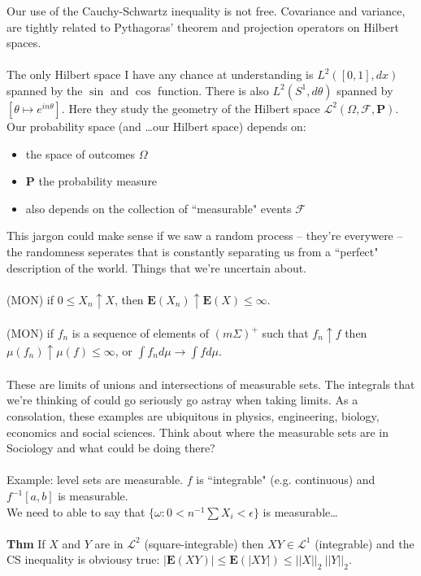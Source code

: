 \documentclass[12pt]{article}
\begin{document}
Our use of the Cauchy-Schwartz inequality is not free.  Covariance and variance, are tightly related to Pythagoras' theorem and projection operators on Hilbert spaces.   \\ \\
The only Hilbert space I have any chance at understanding is $L^2([0,1], dx)$ spanned by the $\sin$ and $\cos$ function. There is also $L^2(S^1, d\theta)$ spanned by $[\theta \mapsto e^{in\theta}]$.  Here they study the geometry of the Hilbert space $\mathcal{L}^2(\Omega, \mathcal{F}, \textbf{P})$.  Our probability space (and \dots our Hilbert space) depends on:
\begin{itemize}
\item the space of outcomes $\Omega$
\item $\textbf{P}$ the probability measure
\item also depends on the collection of ``measurable" events $\mathcal{F}$
\end{itemize}
This jargon could make sense if we saw a random process -- they're everywere -- the randomness seperates that is constantly separating us from a ``perfect" description of the world.  Things that we're uncertain about. \\ \\
(MON) if $0 \leq X_n \uparrow X$, then $\mathbf{E}(X_n) \uparrow \mathbf{E}(X) \leq \infty$.   \\ \\
(MON) if $f_n$ is a sequence of elements of $(m\Sigma)^+$ such that $f_n \uparrow f$ then $\mu(f_n) \uparrow \mu(f) \leq \infty$, or $\int f_n d\mu \to \int f d\mu$.  \\ \\
These are limits of unions and intersections of measurable sets.  The integrals that we're thinking of could go seriously go astray when taking limits.  As a consolation, these examples are ubiquitous in physics, engineering, biology, economics and social sciences.  Think about where the measurable sets are in Sociology and what  could be doing there? \\ \\
{\color{red!50!orange!50!black}Example}: level sets are measurable.  $f$ is ``integrable" (e.g. continuous) and $f^{-1}[a,b]$ is measurable. \\
We need to able to say that $\{ \omega: 0 < n^{-1} \sum X_i < \epsilon\}$ is measurable\dots \\ \\
{\color{red!50!orange!50!black}\textbf{Thm}} If $X$ and $Y$ are in $\mathcal{L}^2$ (square-integrable) then $XY \in \mathcal{L}^1$ (integrable) and the CS inequality is obviousy true: $|\textbf{E}(XY)| \leq \textbf{E}(|XY|) \leq ||X||_2 \ ||Y||_2$. \\ \\
\end{document}
